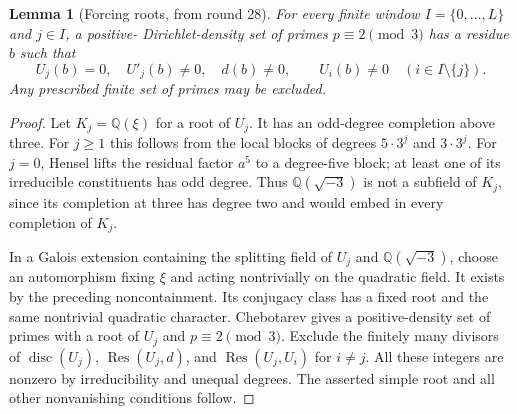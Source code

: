 \documentclass[11pt,a4paper]{article}
\newtheorem{lemma}[theorem]{Lemma}
\theoremstyle{remark}\newtheorem{remark}[theorem]{Remark}
\begin{document}
\begin{lemma}[Forcing roots, from round 28]\label{fac:forcing}
For every finite window $I=\{0,\ldots,L\}$ and $j\in I$, a positive-
Dirichlet-density set of primes $p\equiv2\pmod3$ has a residue $b$ such
that
\[
 U_j(b)=0,\quad U'_j(b)\ne0,\quad d(b)\ne0,
 \qquad U_i(b)\ne0\quad(i\in I\setminus\{j\}).
\]
Any prescribed finite set of primes may be excluded.
\end{lemma}
\begin{proof}
Let $K_j=\mathbb Q(\xi)$ for a root of $U_j$. It has an odd-degree
completion above three. For $j\ge1$ this follows from the local blocks
of degrees $5\cdot3^j$ and $3\cdot3^j$. For $j=0$, Hensel lifts the
residual factor $a^5$ to a degree-five block; at least one of its
irreducible constituents has odd degree. Thus
$\mathbb Q(\sqrt{-3})$ is not a subfield of $K_j$, since its completion
at three has degree two and would embed in every completion of $K_j$.

In a Galois extension containing the splitting field of $U_j$ and
$\mathbb Q(\sqrt{-3})$, choose an automorphism fixing $\xi$ and acting
nontrivially on the quadratic field. It exists by the preceding
noncontainment. Its conjugacy class has a fixed root and the same
nontrivial quadratic character. Chebotarev gives a positive-density
set of primes with a root of $U_j$ and $p\equiv2\pmod3$.
Exclude the finitely many divisors of $\operatorname{disc}(U_j)$,
$\operatorname{Res}(U_j,d)$, and
$\operatorname{Res}(U_j,U_i)$ for $i\ne j$. All these integers are
nonzero by irreducibility and unequal degrees. The asserted simple
root and all other nonvanishing conditions follow.
\end{proof}
\end{document}
